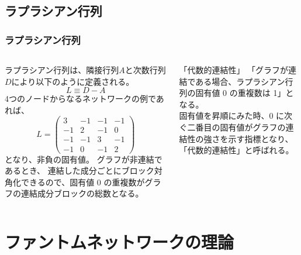 \documentclass[12pt, dvipdfmx]{beamer}
\begin{document}
\subsection{ラプラシアン行列}
\begin{frame}
	\frametitle{ラプラシアン行列}
		\begin{columns}[totalwidth=1\textwidth]
				ラプラシアン行列は、隣接行列$A$と次数行列$D$により以下のように定義される。
				$$
				L \equiv D-A
				$$
				4つのノードからなるネットワークの例であれば、
				$$
				L = \left( 
				\begin{array}{cccc} 
				3 & -1 & -1 & -1 \\ 
				-1 &  2 & -1 & 0 \\
				-1 & -1 &  3 & -1 \\
				-1 &  0 & -1 & 2 
				\end{array} 
				\right) 
				$$
				となり、非負の固有値。
				グラフが非連結であるとき、%
				連結した成分ごとにブロック対角化できるので、固有値 0 の重複数がグラフの連結成分ブロックの総数となる。
				\begin{block}{「代数的連結性」}
					「グラフが連結である場合、ラプラシアン行列の固有値 0 の重複数は 1」となる。\\
					固有値を昇順にみた時、0 に次ぐ二番目の固有値がグラフの連結性の強さを示す指標となり、「代数的連結性」と呼ばれる。
				\end{block}
		\end{columns}
\end{frame}

\section{ファントムネットワークの理論}
\end{document}
